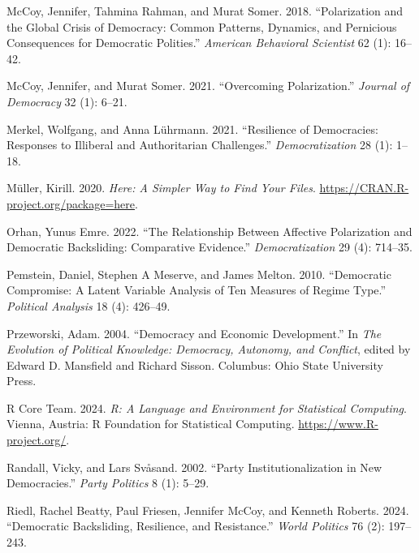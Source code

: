 \documentclass[
  letterpaper,
  DIV=11,
  numbers=noendperiod]{scrartcl}
\newlength{\cslhangindent}
\newenvironment{CSLReferences}[2] %
 {\begin{list}{}{%
  \setlength{\itemindent}{0pt}
  \setlength{\leftmargin}{0pt}
  \setlength{\parsep}{0pt}
  \ifodd #1
   \setlength{\leftmargin}{\cslhangindent}
   \setlength{\itemindent}{-1\cslhangindent}
  \fi
  \setlength{\itemsep}{#2\baselineskip}}}
 {\end{list}}
\begin{document}
\begin{CSLReferences}{1}{0}
McCoy, Jennifer, Tahmina Rahman, and Murat Somer. 2018. {``Polarization
and the Global Crisis of Democracy: Common Patterns, Dynamics, and
Pernicious Consequences for Democratic Polities.''} \emph{American
Behavioral Scientist} 62 (1): 16--42.

McCoy, Jennifer, and Murat Somer. 2021. {``Overcoming Polarization.''}
\emph{Journal of Democracy} 32 (1): 6--21.

Merkel, Wolfgang, and Anna Lührmann. 2021. {``Resilience of Democracies:
Responses to Illiberal and Authoritarian Challenges.''}
\emph{Democratization} 28 (1): 1--18.

Müller, Kirill. 2020. \emph{Here: A Simpler Way to Find Your Files}.
\url{https://CRAN.R-project.org/package=here}.

Orhan, Yunus Emre. 2022. {``The Relationship Between Affective
Polarization and Democratic Backsliding: Comparative Evidence.''}
\emph{Democratization} 29 (4): 714--35.

Pemstein, Daniel, Stephen A Meserve, and James Melton. 2010.
{``Democratic Compromise: A Latent Variable Analysis of Ten Measures of
Regime Type.''} \emph{Political Analysis} 18 (4): 426--49.

Przeworski, Adam. 2004. {``Democracy and Economic Development.''} In
\emph{The Evolution of Political Knowledge: Democracy, Autonomy, and
Conflict}, edited by Edward D. Mansfield and Richard Sisson. Columbus:
Ohio State University Press.

R Core Team. 2024. \emph{{R: A Language and Environment for Statistical
Computing}}. Vienna, Austria: R Foundation for Statistical Computing.
\url{https://www.R-project.org/}.

Randall, Vicky, and Lars Svåsand. 2002. {``Party Institutionalization in
New Democracies.''} \emph{Party Politics} 8 (1): 5--29.

Riedl, Rachel Beatty, Paul Friesen, Jennifer McCoy, and Kenneth Roberts.
2024. {``Democratic Backsliding, Resilience, and Resistance.''}
\emph{World Politics} 76 (2): 197--243.


\end{CSLReferences}
\end{document}
